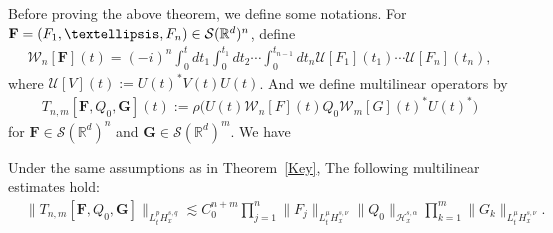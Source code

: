 \documentclass[10pt,a4paper]{amsart}
\newcommand{\BR}{\mathbb{R}}
\newcommand{\vF}{{\mathbf{F}}}
\newcommand{\vG}{{\mathbf{G}}}
\newcommand{\CH}{\mathcal{H}}
\newcommand{\CS}{\mathcal{S}}
\newcommand{\CU}{\mathcal{U}}
\newcommand{\CW}{\mathcal{W}}
\newcommand{\al}{\alpha}
\newcommand{\rh}{\rho}
\newcommand{\ls}{\lesssim}
\begin{document}
Before proving the above theorem, we define some notations. For $\vF=(F_1,\dots, F_n) \linebreak\in \CS(\BR^d)^n$, define
\begin{align}
\CW_n [\vF](t) = (-i)^n \int_0^t dt_1 \int_0^{t_1} dt_2 \cdots \int_0^{t_{n-1}} dt_n
\CU[F_1](t_1) \cdots \CU[F_n](t_n),
\end{align}
where $\CU[V](t):= U(t)^*V(t)U(t)$. And we define multilinear operators by
\begin{align}
T_{n,m}[\vF,Q_0, \vG](t) := \rh \big( U(t)\CW_n[F](t) Q_0 \CW_m [G](t)^* U(t)^* \big)
\end{align}
for $\vF \in \CS(\BR^d)^n$ and $\vG \in \CS(\BR^d)^m$. We have

\begin{lemm}\label{muliti est}
Under the same assumptions as in Theorem~\ref{Key},
The following multilinear estimates hold:
\begin{align}
&\|T_{n,m} [\vF,Q_0,\vG]\|_{L^p_t H^{s,q}_x}
\ls C_0^{n+m}
\prod_{j=1}^n \|F_j\|_{L^{\mu}_t H^{s,\nu}_x}
\|Q_0\|_{\CH^{s,\al}_x}
\prod_{k=1}^m \|G_k\|_{L^{\mu}_t H^{s,\nu}_x}.
\end{align}
\end{lemm}
\end{document}
